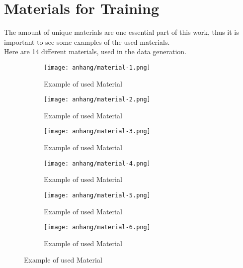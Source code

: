 \chapter{Materials for Training}
\label{appendix:materials-for-training}

	The amount of unique materials are one essential part of this work, thus it is important to see some examples of the used materials.\\
	Here are 14 different materials, used in the data generation.
	
	\begin{figure}[h]
		\centering
		\begin{subfigure}{0.45\textwidth}
			\centering
			\texttt{[image: anhang/material-1.png]}
			\caption[Example of used Material, created by \cite{Quixel}]{Example of used Material}
		\end{subfigure}
		\begin{subfigure}{0.45\textwidth}
			\centering
			\texttt{[image: anhang/material-2.png]}
			\caption[Example of used Material, created by \cite{Quixel}]{Example of used Material}
		\end{subfigure}
		
		\begin{subfigure}{0.45\textwidth}
			\centering
			\texttt{[image: anhang/material-3.png]}
			\caption[Example of used Material, created by \cite{Quixel}]{Example of used Material}
		\end{subfigure}
		\begin{subfigure}{0.45\textwidth}
			\centering
			\texttt{[image: anhang/material-4.png]}
			\caption[Example of used Material, created by \cite{Quixel}]{Example of used Material}
		\end{subfigure}
		
		\begin{subfigure}{0.45\textwidth}
			\centering
			\texttt{[image: anhang/material-5.png]}
			\caption[Example of used Material, created by \cite{Quixel}]{Example of used Material}
		\end{subfigure}
		\begin{subfigure}{0.45\textwidth}
			\centering
			\texttt{[image: anhang/material-6.png]}
			\caption[Example of used Material, created by \cite{Quixel}]{Example of used Material}
		\end{subfigure}
	\end{figure}
	
